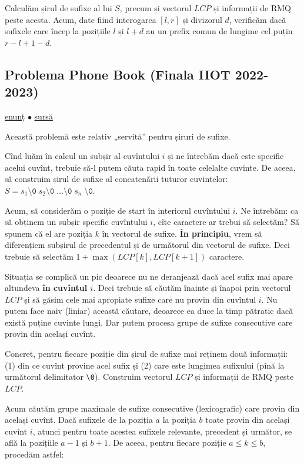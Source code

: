 \documentclass[../main.tex]{subfiles}
\begin{document}
Calculăm șirul de sufixe al lui $S$, precum și vectorul $LCP$ și informații de RMQ peste acesta. Acum, date fiind interogarea $[l, r]$ și divizorul $d$, verificăm dacă sufixele care încep la pozițiile $l$ și $l + d$ au un prefix comun de lungime cel puțin $r - l + 1 - d$.


\subsection{Problema Phone Book (Finala IIOT 2022-2023)}
\label{problem:phone-book}

\href{https://kilonova.ro/problems/457}{enunț}
$\bullet$
\hyperref[code:phone-book]{sursă}

Această problemă este relativ „servită” pentru șiruri de sufixe.

Cînd luăm în calcul un subșir al cuvîntului $i$ și ne întrebăm dacă este specific acelui cuvînt, trebuie să-l putem căuta rapid în toate celelalte cuvinte. De aceea, să construim șirul de sufixe al concatenării tuturor cuvintelor: $S = s_1 \texttt{\textbackslash0} \; s_2 \texttt{\textbackslash0} \; \dots \texttt{\textbackslash0} \; s_n \; \texttt{\textbackslash0}$.

Acum, să considerăm o poziție de start în interiorul cuvîntului $i$. Ne întrebăm: ca să obținem un subșir specific cuvîntului $i$, cîte caractere ar trebui să selectăm? Să spunem că el are poziția $k$ în vectorul de sufixe. \textbf{În principiu}, vrem să diferențiem subșirul de precedentul și de următorul din vectorul de sufixe. Deci trebuie să selectăm $1 + \max(LCP[k], LCP[k + 1])$ caractere.

Situația se complică un pic deoarece nu ne deranjează dacă acel sufix mai apare altundeva \textbf{în cuvîntul $i$}. Deci trebuie să căutăm înainte și înapoi prin vectorul $LCP$ și să găsim cele mai apropiate sufixe care nu provin din cuvîntul $i$. Nu putem face naiv (liniar) această căutare, deoarece ea duce la timp pătratic dacă există puține cuvinte lungi. Dar putem procesa grupe de sufixe consecutive care provin din același cuvînt.

Concret, pentru fiecare poziție din șirul de sufixe mai reținem două informații: (1) din ce cuvînt provine acel sufix și (2) care este lungimea sufixului (pînă la următorul delimitator \texttt{\textbackslash0}). Construim vectorul $LCP$ și informații de RMQ peste $LCP$.

Acum căutăm grupe maximale de sufixe consecutive (lexicografic) care provin din același cuvînt. Dacă sufixele de la poziția $a$ la poziția $b$ toate provin din același cuvînt $i$, atunci pentru toate acestea sufixele relevante, precedent și următor, se află la pozițiile $a - 1$ și $b + 1$. De aceea, pentru fiecare poziție $a \leq k \leq b$, procedăm astfel:
\end{document}
